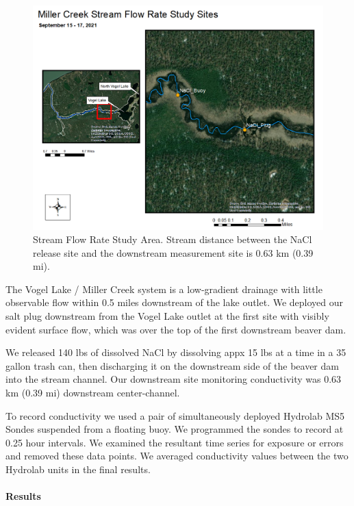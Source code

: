 \documentclass[
]{book}
\begin{document}
\begin{figure}
\includegraphics[width=14.67in]{images/stream_flow_rate_sites} \caption{Stream Flow Rate Study Area. Stream distance between the NaCl release site and the downstream measurement site is 0.63 km (0.39 mi).}\label{fig:nacl-map}
\end{figure}

The Vogel Lake / Miller Creek system is a low-gradient drainage with little observable flow within 0.5 miles downstream of the lake outlet. We deployed our salt plug downstream from the Vogel Lake outlet at the first site with visibly evident surface flow, which was over the top of the first downstream beaver dam.

We released 140 lbs of dissolved NaCl by dissolving appx 15 lbs at a time in a 35 gallon trash can, then discharging it on the downstream side of the beaver dam into the stream channel. Our downstream site monitoring conductivity was 0.63 km (0.39 mi) downstream center-channel.

To record conductivity we used a pair of simultaneously deployed Hydrolab MS5 Sondes suspended from a floating buoy. We programmed the sondes to record at 0.25 hour intervals. We examined the resultant time series for exposure or errors and removed these data points. We averaged conductivity values between the two Hydrolab units in the final results.

\hypertarget{results}{%
\paragraph{Results}\label{results}}
\end{document}

